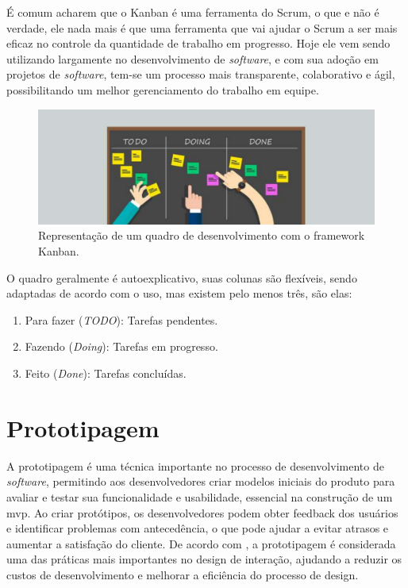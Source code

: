 É comum acharem que o Kanban é uma ferramenta do Scrum, o que e não é verdade, ele nada mais é que uma ferramenta que vai ajudar o Scrum a ser mais eficaz no controle da quantidade de trabalho em progresso. Hoje ele vem sendo utilizando largamente no desenvolvimento de \textit{software}, e com sua adoção em projetos de \textit{software}, tem-se um processo mais transparente, colaborativo e ágil, possibilitando um melhor gerenciamento do trabalho em equipe.

\begin{figure}[h]
\centering
  \includegraphics[width=\columnwidth]{images/kanban.pdf}
  \caption{Representação de um quadro de desenvolvimento com o framework Kanban.}
  \label{fig:kanban}
\end{figure}

O quadro geralmente é autoexplicativo, suas colunas são flexíveis, sendo adaptadas de acordo com o uso, mas existem pelo menos três, são elas:

\begin{enumerate}
    \item Para fazer (\textit{TODO}): Tarefas pendentes.
    \item Fazendo (\textit{Doing}): Tarefas em progresso.
    \item Feito (\textit{Done}): Tarefas concluídas.
\end{enumerate}

\section{Prototipagem}\label{sec:prototipagem}
A prototipagem é uma técnica importante no processo de desenvolvimento de \textit{software}, permitindo aos desenvolvedores criar modelos iniciais do produto para avaliar e testar sua funcionalidade e usabilidade, essencial na construção de um \ac{mvp}. Ao criar protótipos, os desenvolvedores podem obter feedback dos usuários e identificar problemas com antecedência, o que pode ajudar a evitar atrasos e aumentar a satisfação do cliente. De acordo com \cite{fidel2003user}, a prototipagem é considerada uma das práticas mais importantes no design de interação, ajudando a reduzir os custos de desenvolvimento e melhorar a eficiência do processo de design.

